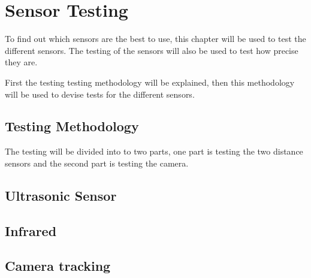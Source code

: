 \section{Sensor Testing}
To find out which sensors are the best to use, this chapter will be used to test
the different sensors. The testing of the sensors will also be used to test how
precise they are.\nl

First the testing testing methodology will be explained, then this methodology
will be used to devise tests for the different sensors. 

\subsection{Testing Methodology}
The testing will be divided into to two parts, one part is testing the two
distance sensors and the second part is testing the camera. 

\subsection{Ultrasonic Sensor}

\subsection{Infrared}

\subsection{Camera tracking}%